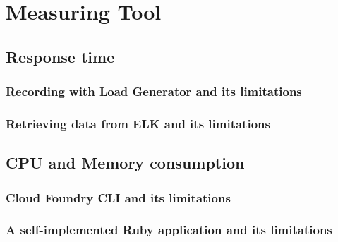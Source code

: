 \chapter{Measuring Tool}
\section{Response time}
\subsection{Recording with Load Generator and its limitations}
\subsection{Retrieving data from ELK and its limitations}
\section{CPU and Memory consumption}
\subsection{Cloud Foundry CLI and its limitations}
\subsection{A self-implemented  Ruby application and its limitations}


